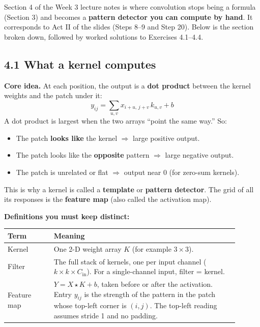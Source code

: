 \bigskip

Section 4 of the Week 3 lecture notes is where convolution stops being a formula (Section 3) and becomes a \textbf{pattern detector you can compute by hand}. It corresponds to Act II of the slides (Steps 8--9 and Step 20). Below is the section broken down, followed by worked solutions to Exercises 4.1--4.4.

\subsection*{4.1 What a kernel computes}

\textbf{Core idea.} At each position, the output is a \textbf{dot product} between the kernel weights and the patch under it:
\[
y_{ij} = \sum_{u,v} x_{i+u,\,j+v}\,k_{u,v} + b
\]
A dot product is largest when the two arrays ``point the same way.'' So:
\begin{itemize}[nosep]
  \item The patch \textbf{looks like} the kernel $\Rightarrow$ large positive output.
  \item The patch looks like the \textbf{opposite} pattern $\Rightarrow$ large negative output.
  \item The patch is unrelated or flat $\Rightarrow$ output near 0 (for zero-sum kernels).
\end{itemize}
This is why a kernel is called a \textbf{template} or \textbf{pattern detector}. The grid of all its responses is the \textbf{feature map} (also called the activation map).

\textbf{Definitions you must keep distinct:}

\begin{center}
\begin{tabular}{>{\raggedright}p{0.18\linewidth} p{0.72\linewidth}}
\toprule
Term & Meaning \\
\midrule
Kernel & One 2-D weight array $K$ (for example $3\times3$). \\
Filter & The full stack of kernels, one per input channel ($k\times k\times C_{\text{in}}$). For a single-channel input, filter = kernel. \\
Feature map & $Y = X \star K + b$, taken before or after the activation. Entry $y_{ij}$ is the strength of the pattern in the patch whose top-left corner is $(i,j)$. The top-left reading assumes stride 1 and no padding. \\
\bottomrule
\end{tabular}
\end{center}


